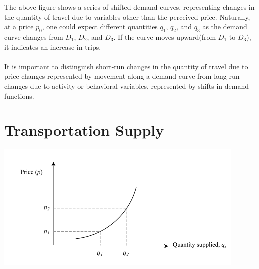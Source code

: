 The above figure shows a series of shifted demand curves, representing changes in the quantity of travel due to variables other than the perceived price. Naturally, at a price $p_0$, one could expect different quantities $q_1$, $q_2$, and $q_3$ as the demand curve changes from $D_1$, $D_2$, and $D_3$. If the curve moves upward(from $D_1$ to $D_3$), it indicates an increase in trips.
\paragraph{}
It is important to distinguish short-run changes in the quantity of travel due to price changes represented by movement along a demand curve from long-run changes due to activity or behavioral variables, represented by shifts in demand functions.
%
\section{Transportation Supply}
\begin{center}
	\includegraphics{gfx/fig42.png}
\end{center}
